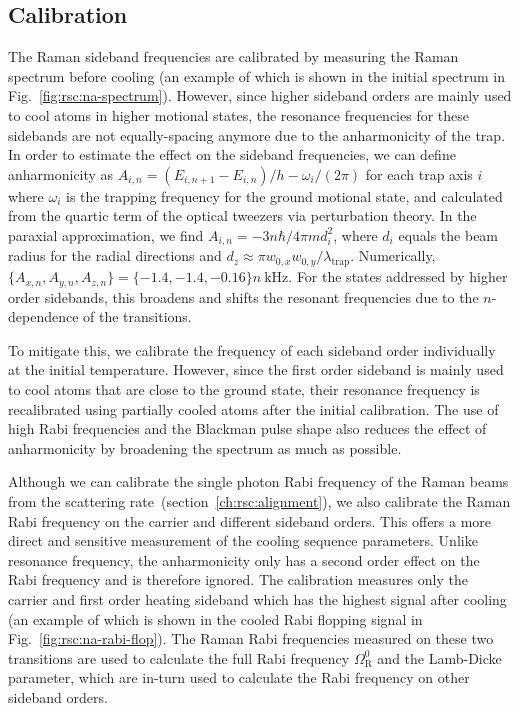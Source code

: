\subsection{Calibration}
\label{ch:rsc:implementation:calibration}

The Raman sideband frequencies are calibrated by measuring the Raman spectrum before cooling
(an example of which is shown in the initial spectrum in Fig.~\ref{fig:rsc:na-spectrum}).
However, since higher sideband orders are mainly used to cool atoms in higher motional states,
the resonance frequencies for these sidebands are not equally-spacing anymore due to
the anharmonicity of the trap.
In order to estimate the effect on the sideband frequencies,
we can define anharmonicity as $A_{i,n}=(E_{i,n+1}-E_{i,n})/h - \omega_i/(2\pi)$
for each trap axis $i$ where $\omega_i$ is the trapping frequency for the ground motional state,
and calculated from the quartic term of the optical tweezers via perturbation theory.
In the paraxial approximation, we find $A_{i,n}=-3n\hbar/4\pi m d_i^2$,
where $d_i$ equals the beam radius for the radial directions and
$d_z\approx\pi w_{0,x}w_{0,y}/\lambda_{\textrm{trap}}$.
Numerically, $\{A_{x,n},A_{y,n},A_{z,n}\}=\{-1.4, -1.4, -0.16\}n~\mathrm{kHz}$.
For the states addressed by higher order sidebands,
this broadens and shifts the resonant frequencies
due to the $n$-dependence of the transitions.

To mitigate this, we calibrate the frequency of each sideband order individually
at the initial temperature. However, since the first order sideband is mainly used to cool atoms
that are close to the ground state,
their resonance frequency  is recalibrated using partially cooled atoms after the initial calibration.
The use of high Rabi frequencies and the Blackman pulse shape also reduces the effect
of anharmonicity by broadening the spectrum as much as possible.

Although we can calibrate the single photon Rabi frequency of the Raman beams from
the scattering rate~(section~\ref{ch:rsc:alignment}),
we also calibrate the Raman Rabi frequency on the carrier and different sideband orders.
This offers a more direct and sensitive measurement of the cooling sequence parameters.
Unlike resonance frequency, the anharmonicity only has a second order effect on the Rabi frequency
and is therefore ignored. The calibration measures
only the carrier and first order heating sideband which has the highest signal after cooling
(an example of which is shown in the cooled Rabi flopping signal in
Fig.~\ref{fig:rsc:na-rabi-flop}).
The Raman Rabi frequencies measured on these two transitions are used to calculate
the full Rabi frequency $\Omega_{\mathrm{R}}^0$ and the Lamb-Dicke parameter,
which are in-turn used to calculate the Rabi frequency on other sideband orders.

